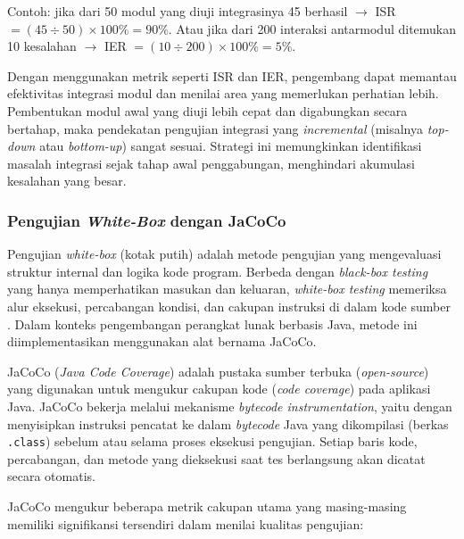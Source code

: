 Contoh: jika dari 50 modul yang diuji integrasinya 45 berhasil $\rightarrow$ ISR $= (45 \div 50) \times 100\% = 90\%$. Atau jika dari 200 interaksi antarmodul ditemukan 10 kesalahan $\rightarrow$ IER $= (10 \div 200) \times 100\% = 5\%$.\par

Dengan menggunakan metrik seperti ISR dan IER, pengembang dapat memantau efektivitas integrasi modul dan menilai area yang memerlukan perhatian lebih. Pembentukan modul awal yang diuji lebih cepat dan digabungkan secara bertahap, maka pendekatan pengujian integrasi yang \textit{incremental} (misalnya \textit{top-down} atau \textit{bottom-up}) sangat sesuai. Strategi ini memungkinkan identifikasi masalah integrasi sejak tahap awal penggabungan, menghindari akumulasi kesalahan yang besar.\par

\subsubsection{Pengujian \textit{White-Box} dengan JaCoCo} \label{II.JaCoCo}
Pengujian \textit{white-box} (kotak putih) adalah metode pengujian yang mengevaluasi struktur internal dan logika kode program. Berbeda dengan \textit{black-box testing} yang hanya memperhatikan masukan dan keluaran, \textit{white-box testing} memeriksa alur eksekusi, percabangan kondisi, dan cakupan instruksi di dalam kode sumber \cite{rehman2007testing}. Dalam konteks pengembangan perangkat lunak berbasis Java, metode ini diimplementasikan menggunakan alat bernama JaCoCo.\par

JaCoCo (\textit{Java Code Coverage}) adalah pustaka sumber terbuka (\textit{open-source}) yang digunakan untuk mengukur cakupan kode (\textit{code coverage}) pada aplikasi Java. JaCoCo bekerja melalui mekanisme \textit{bytecode instrumentation}, yaitu dengan menyisipkan instruksi pencatat ke dalam \textit{bytecode} Java yang dikompilasi (berkas \texttt{.class}) sebelum atau selama proses eksekusi pengujian. Setiap baris kode, percabangan, dan metode yang dieksekusi saat tes berlangsung akan dicatat secara otomatis.\par

JaCoCo mengukur beberapa metrik cakupan utama yang masing-masing memiliki signifikansi tersendiri dalam menilai kualitas pengujian:\par

